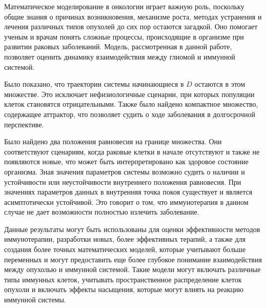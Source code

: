 \documentclass[14pt,a4paper]{extarticle}
\begin{document}
	\begin{conclusion}
	Математическое моделирование в онкологии играет важную роль, поскольку общие знания о причинах возникновения, механизме роста, методах устранения и лечения различных типов опухолей до сих пор остаются загадкой. Оно помогает ученым и врачам понять сложные процессы, происходящие в организме при развитии раковых заболеваний. Модель, рассмотренная в данной работе, позволяет оценить динамику взаимодействия между глиомой и иммунной системой.
	
	Было показано, что траектории системы начинающиеся в $D$ остаются в этом множестве. Это исключает нефизиологичные сценарии, при которых популяции клеток становятся отрицательными. Также было найдено компактное множество, содержащее аттрактор, что позволяет судить о ходе заболевания в долгосрочной перспективе.
	
	Было найдено два положения равновесия на границе множества. Они соответствуют сценариям, когда раковые клетки в начале отсутствуют и также не появляются новые, что может быть интерпретировано как здоровое состояние организма. Зная значения параметров системы возможно судить о наличии и устойчивости или неустойчивости внутреннего положения равновесия. При значениях параметров данных в \cite{model_params} внутренняя точка покоя существует и является асимптотически устойчивой. Это говорит о том, что иммунотерапия в данном случае не дает возможности полностью излечить заболевание. 
	
	Данные результаты могут быть использованы для оценки эффективности методов иммунотерапии, разработки новых, более эффективных терапий, а также для создания более точных математических моделей, которые учитывают больше переменных и могут предоставить еще более глубокое понимание взаимодействия между опухолью и иммунной системой. Такие модели могут включать различные типы иммунных клеток, учитывать пространственное распределение клеток опухоли и включать эффекты насыщения, которые могут влиять на реакцию иммунной системы.
	\end{conclusion}
	
\end{document}
